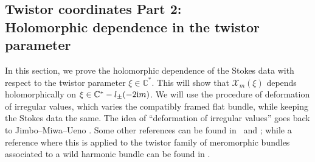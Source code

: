 \subsection[Twistor coordinates Part 2: Holomorphic dependence in the twistor parameter]{Twistor coordinates Part 2:\\ Holomorphic dependence in the twistor parameter}

In this section, we prove the holomorphic dependence of the Stokes data with respect to the twistor parameter $\xi \in \mathbb{C}^*$. This will show that $\mathcal{X}_{m}(\xi)$ depends holomorphically on $\xi \in \mathbb{C}^*-l_{\pm}(-2{\rm i}m)$. We will use the procedure of deformation of irregular values, which varies the compatibly framed flat bundle, while keeping the Stokes data the same. The idea of ``deformation of irregular values'' goes back to Jimbo--Miwa--Ueno \cite{JMU}. Some other references can be found in~\cite{B} and \cite{M6}; while a reference where this is applied to the twistor family of meromorphic bundles associated to a wild harmonic bundle can be found in \cite[Chapters 3, 4, 9 and 11]{M}.

